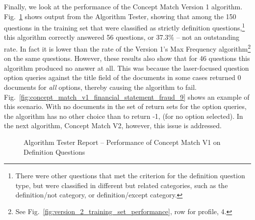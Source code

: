 Finally, we look at the performance of the Concept Match Version 1 algorithm.  Fig.~\ref{fig:concept_match_v1_training_set_results_def} shows output from the Algorithm Tester, showing that among the 150 questions in the training set that were classified as strictly definition questions,\footnote{There were other questions that met the criterion for the definition question type, but were classified in different but related categories, such as the definition/not category, or definition/except category.} this algorithm correctly answered 56 questions, or 37.3\% -- not an outstanding rate.  In fact it is lower than the rate of the Version 1's Max Frequency algorithm\footnote{See  Fig.~\ref{fig:version_2_training_set_performance}, row for profile, 4.} on the same questions. However, these results also show that for 46 questions this algorithm produced no answer at all.  This was because the laser-focused question option queries against the title field of the documents in some cases returned 0 documents for \emph{all} options, thereby causing the algorithm to fail.  Fig.~\ref{fig:concept_match_v1_financial_statement_fraud_9} shows an example of this scenario.  With no documents in the set of return sets for the option queries, the algorithm has no other choice than to return -1, (for no option selected).  In the next algorithm, Concept Match V2, however, this issue is addressed.


\begin{figure}
\centering
\vspace{1.0in}
\caption{Algorithm Tester Report -- Performance of Concept Match V1 on Definition Questions}
\label{fig:concept_match_v1_training_set_results_def}
\end{figure}

